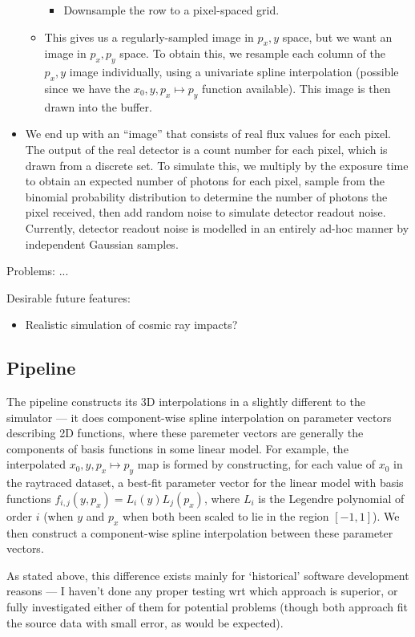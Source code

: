 \begin{itemize}
\begin{itemize}
\begin{itemize}
%
\item Downsample the row to a pixel-spaced grid.
\end{itemize}
%
\item This gives us a regularly-sampled image in $p_x, y$ space, but we want an image
in $p_x, p_y$ space. To obtain this, we resample each column of the $p_x, y$ image
individually, using a univariate spline interpolation (possible since we have the
$x_0, y, p_x \mapsto p_y$ function available). This image is then drawn into the buffer.
\end{itemize}
%
\item We end up with an ``image'' that consists of real flux values for
each pixel. The output of the real detector is a count number for each
pixel, which is drawn from a discrete set. To simulate this, we multiply
by the exposure time to obtain an expected number of photons for each
pixel, sample from the binomial probability distribution to determine
the number of photons the pixel received, then add random noise to simulate
detector readout noise. Currently, detector readout noise is modelled in an
entirely ad-hoc manner by independent Gaussian samples.

\end{itemize}
%

Problems: ...

Desirable future features:
\begin{itemize}
\item Realistic simulation of cosmic ray impacts?
\end{itemize}


\subsection{Pipeline}

The pipeline constructs its 3D interpolations in a slightly
different to the simulator --- it does component-wise spline interpolation
on parameter vectors describing 2D functions, where these paremeter vectors
are generally the components of basis functions in some linear model.
For example, the interpolated $x_0, y, p_x \mapsto p_y$ map is formed by
constructing, for each value of $x_0$ in the raytraced dataset, a best-fit
parameter vector for the linear model with basis functions $f_{i,j}(y, p_x) = L_i (y) L_j (p_x)$, where $L_i$ is the Legendre polynomial of order $i$ (when $y$
and $p_x$ when both been scaled to lie in the region $[-1,1]$). We then construct
a component-wise spline interpolation between these parameter vectors.

As stated above, this difference exists mainly for `historical' software development
reasons --- I haven't done any proper testing wrt which approach is superior, or
fully investigated either of them for potential problems (though both approach
fit the source data with small error, as would be expected).
